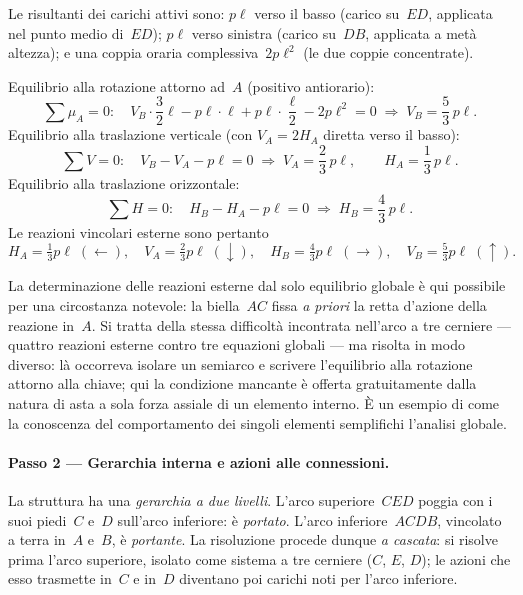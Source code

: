 Le risultanti dei carichi attivi sono: $p\ell$ verso il
basso (carico su~$ED$, applicata nel punto medio di~$ED$);
$p\ell$ verso sinistra (carico su~$DB$, applicata a metà
altezza); e una coppia oraria complessiva~$2p\ell^2$ (le due
coppie concentrate).

\medskip
\noindent Equilibrio alla rotazione attorno ad~$A$
(positivo antiorario):
\[
\sum \mu_A = 0:\quad
V_B\cdot\frac{3}{2}\ell
- p\ell\cdot\ell
+ p\ell\cdot\frac{\ell}{2}
- 2p\ell^2 = 0
\;\Rightarrow\;
V_B = \frac{5}{3}\,p\ell .
\]
\noindent Equilibrio alla traslazione verticale (con
$V_A = 2H_A$ diretta verso il basso):
\[
\sum V = 0:\quad
V_B - V_A - p\ell = 0
\;\Rightarrow\;
V_A = \frac{2}{3}\,p\ell,
\qquad
H_A = \frac{1}{3}\,p\ell .
\]
\noindent Equilibrio alla traslazione orizzontale:
\[
\sum H = 0:\quad
H_B - H_A - p\ell = 0
\;\Rightarrow\;
H_B = \frac{4}{3}\,p\ell .
\]
Le reazioni vincolari esterne sono pertanto
\[
H_A = \tfrac{1}{3}p\ell \;(\leftarrow),\quad
V_A = \tfrac{2}{3}p\ell \;(\downarrow),\quad
H_B = \tfrac{4}{3}p\ell \;(\rightarrow),\quad
V_B = \tfrac{5}{3}p\ell \;(\uparrow).
\]

\begin{oss}
	La determinazione delle reazioni esterne dal solo
	equilibrio globale è qui possibile per una circostanza
	notevole: la biella~$AC$ fissa \emph{a priori} la
	retta d'azione della reazione in~$A$. Si tratta della
	stessa difficoltà incontrata nell'arco a tre cerniere
	--- quattro reazioni esterne contro tre equazioni globali
	--- ma risolta in modo diverso: là occorreva isolare un
	semiarco e scrivere l'equilibrio alla rotazione attorno
	alla chiave; qui la condizione mancante è offerta
	gratuitamente dalla natura di asta a sola forza assiale
	di un elemento interno. È un esempio di come la
	conoscenza del comportamento dei singoli elementi
	semplifichi l'analisi globale.
\end{oss}

\paragraph{Passo 2 --- Gerarchia interna e azioni
	alle connessioni.}

La struttura ha una \emph{gerarchia a due livelli}.
L'arco superiore~$CED$ poggia con i suoi piedi~$C$ e~$D$
sull'arco inferiore: è \emph{portato}. L'arco
inferiore~$ACDB$, vincolato a terra in~$A$ e~$B$, è
\emph{portante}. La risoluzione procede dunque \emph{a
	cascata}: si risolve prima l'arco superiore, isolato come
sistema a tre cerniere ($C$, $E$, $D$); le azioni che esso
trasmette in~$C$ e in~$D$ diventano poi carichi noti per
l'arco inferiore.

